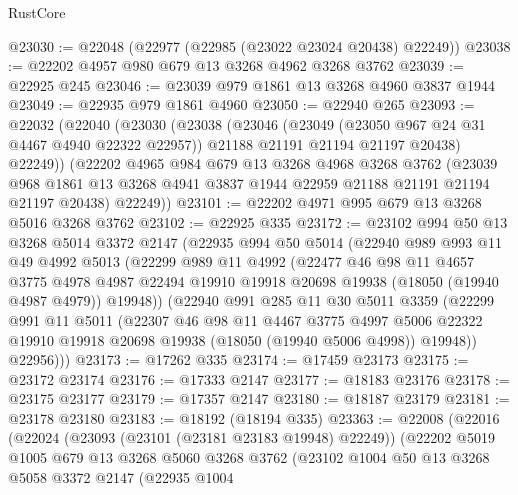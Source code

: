 \begin{lexlean}{RustCore}
\begin{coremodule}
@23030 := @22048 (@22977 (@22985 (@23022 @23024 @20438) @22249))
@23038 := @22202 @4957 @980 @679 @13 @3268 @4962 @3268 @3762
@23039 := @22925 @245
@23046 := @23039 @979 @1861 @13 @3268 @4960 @3837 @1944
@23049 := @22935 @979 @1861 @4960
@23050 := @22940 @265
@23093 := @22032
    (@22040
      (@23030
        (@23038
          (@23046
            (@23049 (@23050 @967 @24 @31 @4467 @4940 @22322 @22957))
            @21188
            @21191
            @21194
            @21197
            @20438)
          @22249))
      (@22202
        @4965
        @984
        @679
        @13
        @3268
        @4968
        @3268
        @3762
        (@23039 @968 @1861 @13 @3268 @4941 @3837 @1944 @22959 @21188 @21191 @21194 @21197 @20438)
        @22249))
@23101 := @22202 @4971 @995 @679 @13 @3268 @5016 @3268 @3762
@23102 := @22925 @335
@23172 := @23102
    @994
    @50
    @13
    @3268
    @5014
    @3372
    @2147
    (@22935
      @994
      @50
      @5014
      (@22940
        @989
        @993
        @11
        @49
        @4992
        @5013
        (@22299
          @989
          @11
          @4992
          (@22477
            @46
            @98
            @11
            @4657
            @3775
            @4978
            @4987
            @22494
            @19910
            @19918
            @20698
            @19938
            (@18050 (@19940 @4987 @4979))
            @19948))
        (@22940
          @991
          @285
          @11
          @30
          @5011
          @3359
          (@22299
            @991
            @11
            @5011
            (@22307
              @46
              @98
              @11
              @4467
              @3775
              @4997
              @5006
              @22322
              @19910
              @19918
              @20698
              @19938
              (@18050 (@19940 @5006 @4998))
              @19948))
          @22956)))
@23173 := @17262 @335
@23174 := @17459 @23173
@23175 := @23172 @23174
@23176 := @17333 @2147
@23177 := @18183 @23176
@23178 := @23175 @23177
@23179 := @17357 @2147
@23180 := @18187 @23179
@23181 := @23178 @23180
@23183 := @18192 (@18194 @335)
@23363 := @22008
    (@22016
      (@22024
        (@23093 (@23101 (@23181 @23183 @19948) @22249))
        (@22202
          @5019
          @1005
          @679
          @13
          @3268
          @5060
          @3268
          @3762
          (@23102
            @1004
            @50
            @13
            @3268
            @5058
            @3372
            @2147
            (@22935
              @1004

\end{coremodule}
\end{lexlean}

